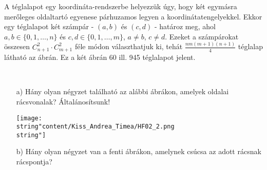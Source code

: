 \begin{solution}
A téglalapot egy koordináta-rendszerbe helyezzük úgy, hogy két egymásra
merőleges oldaltartó egyenese párhuzamos legyen a koordinátatengelyekkel.
Ekkor egy téglalapot két számpár - $(a,b)$ és $(c,d)$ - határoz
meg, ahol $a,b\in\{0,1,\dots,n\}$ és $c,d\in\{0,1,\dots,m\}$, $a\neq b$,
$c\neq d$. Ezeket a számpárokat összesen $C_{n+1}^{2}\cdot C_{m+1}^{2}$
féle módon választhatjuk ki, tehát $\frac{nm(m+1)(n+1)}{4}$ téglalap
látható az ábrán. Ez a két ábrán 60 ill. 945 téglalapot jelent.
\end{solution}
\begin{extraproblem}
~
\begin{itemize}
\item[a)] Hány olyan négyzet található az alábbi ábrákon, amelyek oldalai rácsvonalak?
Általánosítsunk! 
\begin{center}
\texttt{[image: \\string"content/Kiss\_Andrea\_Timea/HF02\_2.png\\string"]} 
\par\end{center}
\item[b)] Hány olyan négyzet van a fenti ábrákon, amelynek csúcsa az adott
rácsnak rácspontja? 
\end{itemize}
\end{extraproblem}

